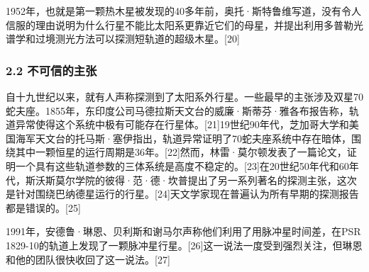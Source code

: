 1952年，也就是第一颗热木星被发现的40多年前，奥托·斯特鲁维写道，没有令人信服的理由说明为什么行星不能比太阳系更靠近它们的母星，并提出利用多普勒光谱学和过境测光方法可以探测短轨道的超级木星。[20]
\subsubsection{2.2 不可信的主张}
自十九世纪以来，就有人声称探测到了太阳系外行星。一些最早的主张涉及双星70蛇夫座。1855年，东印度公司马德拉斯天文台的威廉·斯蒂芬·雅各布报告称，轨道异常使得这个系统中极有可能存在行星体。[21]19世纪90年代，芝加哥大学和美国海军天文台的托马斯·塞伊指出，轨道异常证明了70蛇夫座系统中存在暗体，围绕其中一颗恒星的运行周期是36年。[22]然而，林雷·莫尔顿发表了一篇论文，证明一个具有这些轨道参数的三体系统是高度不稳定的。[23]在20世纪50年代和60年代，斯沃斯莫尔学院的彼得·范·德·坎普提出了另一系列著名的探测主张，这次是针对围绕巴纳德星运行的行星。[24]天文学家现在普遍认为所有早期的探测报告都是错误的。[25]

1991年，安德鲁·琳恩、贝利斯和谢马尔声称他们利用了用脉冲星时间差，在PSR 1829-10的轨道上发现了一颗脉冲星行星。[26]这一说法一度受到强烈关注，但琳恩和他的团队很快收回了这一说法。[27]
